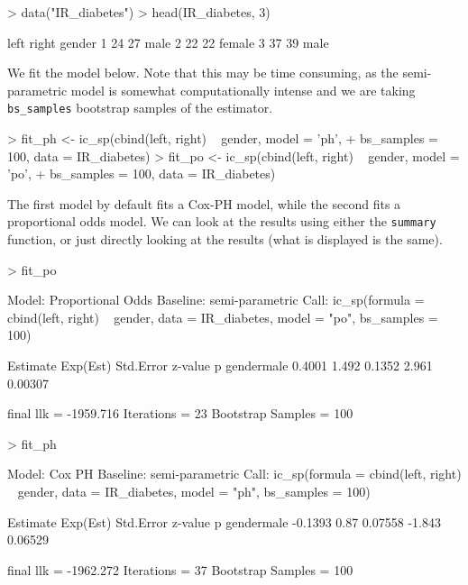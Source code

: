 \documentclass[a4paper]{article}
\begin{document}
\begin{Schunk}
\begin{Sinput}
> data("IR_diabetes")
> head(IR_diabetes, 3)
\end{Sinput}
\begin{Soutput}
  left right gender
1   24    27   male
2   22    22 female
3   37    39   male
\end{Soutput}
\end{Schunk}
  
We fit the model below. Note that this may be time consuming, as the semi-parametric model is somewhat computationally intense and we are taking \texttt{bs\_samples} bootstrap samples of the estimator. 
  
\begin{Schunk}
\begin{Sinput}
>   fit_ph <- ic_sp(cbind(left, right) ~ gender, model = 'ph', 
+                   bs_samples = 100, data = IR_diabetes)
>   fit_po <- ic_sp(cbind(left, right) ~ gender, model = 'po',
+                   bs_samples = 100, data = IR_diabetes)
\end{Sinput}
\end{Schunk}

The first model by default fits a Cox-PH model, while the second fits a proportional odds model. We can look at the results using either the \texttt{summary} function, or just directly looking at the results (what is displayed is the same). 
  
\begin{Schunk}
\begin{Sinput}
>   fit_po
\end{Sinput}
\begin{Soutput}
Model:  Proportional Odds
Baseline:  semi-parametric 
Call: ic_sp(formula = cbind(left, right) ~ gender, data = IR_diabetes, 
    model = "po", bs_samples = 100)

           Estimate Exp(Est) Std.Error z-value       p
gendermale   0.4001    1.492    0.1352   2.961 0.00307

final llk =  -1959.716 
Iterations =  23 
Bootstrap Samples =  100 
\end{Soutput}
\begin{Sinput}
>   fit_ph
\end{Sinput}
\begin{Soutput}
Model:  Cox PH
Baseline:  semi-parametric 
Call: ic_sp(formula = cbind(left, right) ~ gender, data = IR_diabetes, 
    model = "ph", bs_samples = 100)

           Estimate Exp(Est) Std.Error z-value       p
gendermale  -0.1393     0.87   0.07558  -1.843 0.06529

final llk =  -1962.272 
Iterations =  37 
Bootstrap Samples =  100 
\end{Soutput}
\end{Schunk}
\end{document}
